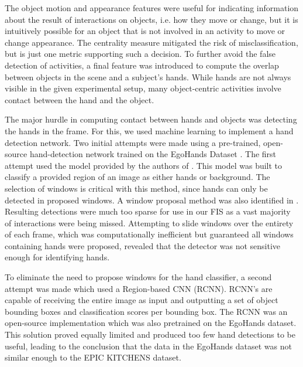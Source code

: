 \documentclass[12pt]{report}
\begin{document}
The object motion and appearance features were useful for indicating information about the result of interactions on objects, i.e. how they move or change, but it is intuitively possible for an object that is not involved in an activity to move or change appearance. The centrality measure mitigated the risk of misclassification, but is just one metric supporting such a decision. To further avoid the false detection of activities, a final feature was introduced to compute the overlap between objects in the scene and a subject's hands. While hands are not always visible in the given experimental setup, many object-centric activities involve contact between the hand and the object. 

The major hurdle in computing contact between hands and objects was detecting the hands in the frame. For this, we used machine learning to implement a hand detection network. Two initial attempts were made using a pre-trained, open-source hand-detection network trained on the EgoHands Dataset \cite{Bambach2015}. The first attempt used the model provided by the authors of \cite{Bambach2015}. This model was built to classify a provided region of an image as either hands or background. The selection of windows is critical with this method, since hands can only be detected in proposed windows. A window proposal method was also identified in \cite{Bambach2015}. Resulting detections were much too sparse for use in our FIS as a vast majority of interactions were being missed. Attempting to slide windows over the entirety of each frame, which was computationally inefficient but guaranteed all windows containing hands were proposed, revealed that the detector was not sensitive enough for identifying hands.

To eliminate the need to propose windows for the hand classifier, a second attempt was made which used a Region-based CNN (RCNN). RCNN's are capable of receiving the entire image as input and outputting a set of object bounding boxes and classification scores per bounding box. The RCNN was an open-source implementation which was also pretrained on the EgoHands dataset. This solution proved equally limited and produced too few hand detections to be useful, leading to the conclusion that the data in the EgoHands dataset was not similar enough to the EPIC KITCHENS dataset.
\end{document}
